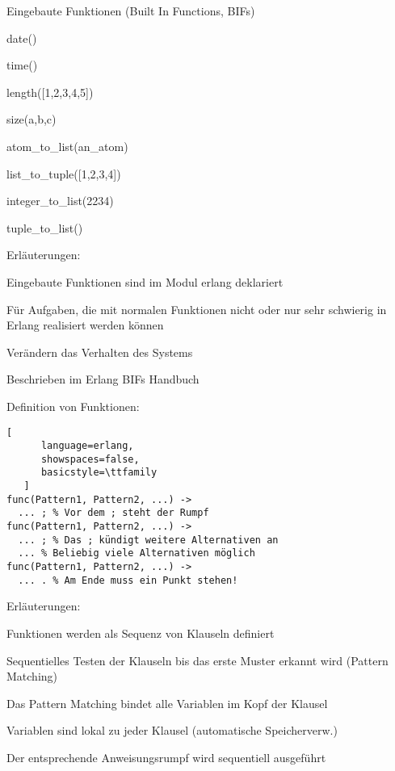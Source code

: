 \documentclass[10pt]{article}
\begin{document}
Eingebaute Funktionen (Built In Functions, BIFs)
\begin{itemize*}
  \item date()
  \item time()
  \item length([1,2,3,4,5])
  \item size({a,b,c})
  \item atom\_to\_list(an\_atom)
  \item list\_to\_tuple([1,2,3,4])
  \item integer\_to\_list(2234)
  \item tuple\_to\_list({})
  \item Erläuterungen:
  \begin{itemize*}
    \item Eingebaute Funktionen sind im Modul erlang deklariert
    \item Für Aufgaben, die mit normalen Funktionen nicht oder nur sehr schwierig in Erlang realisiert werden können
    \item Verändern das Verhalten des Systems
    \item Beschrieben im Erlang BIFs Handbuch
  \end{itemize*}
\end{itemize*}

Definition von Funktionen:
\begin{lstlisting}[
      language=erlang,
      showspaces=false,
      basicstyle=\ttfamily
   ]
func(Pattern1, Pattern2, ...) ->
  ... ; % Vor dem ; steht der Rumpf
func(Pattern1, Pattern2, ...) ->
  ... ; % Das ; kündigt weitere Alternativen an
  ... % Beliebig viele Alternativen möglich
func(Pattern1, Pattern2, ...) ->
  ... . % Am Ende muss ein Punkt stehen!
\end{lstlisting}
Erläuterungen:
\begin{itemize*}
  \item Funktionen werden als Sequenz von Klauseln definiert
  \item Sequentielles Testen der Klauseln bis das erste Muster erkannt wird (Pattern Matching)
  \item Das Pattern Matching bindet alle Variablen im Kopf der Klausel
  \item Variablen sind lokal zu jeder Klausel (automatische Speicherverw.)
  \item Der entsprechende Anweisungsrumpf wird sequentiell ausgeführt
\end{itemize*}
\end{document}

